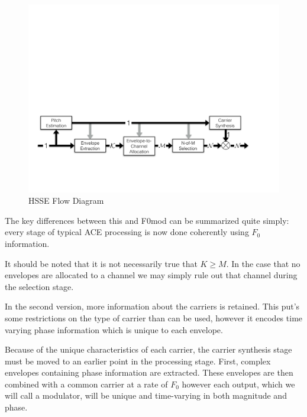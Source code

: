 \documentclass [11pt, proquest] {uwthesis}[2015/03/03]
\begin{document}
\begin{figure}[!ht]
  \centering
    \includegraphics[width=1\textwidth]{HSSE_flow_diagram_noPhase}   
    \caption{HSSE Flow Diagram}\label{fig:HSSE_flow_1}
\end{figure}

The key differences between this and F0mod can be summarized quite simply: every stage of typical ACE processing is now done coherently using $F_0$ information.

It should be noted that it is not necessarily true that $K \geq M$.  In the case that no envelopes are allocated to a channel we may simply rule out that channel during the selection stage.

In the second version, more information about the carriers is retained.  This put's some restrictions on the type of carrier than can be used, however it encodes time varying phase information which is unique to each envelope.

Because of the unique characteristics of each carrier, the carrier synthesis stage must be moved to an earlier point in the processing stage.  First, complex envelopes containing phase information are extracted.  These envelopes are then combined with a common carrier at a rate of $F_0$ however each output, which we will call a modulator, will be unique and time-varying in both magnitude and phase.
\end{document}
